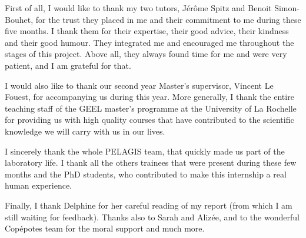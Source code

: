 
First of all, I would like to thank my two tutors, Jérôme Spitz and Benoit Simon-Bouhet, for the trust they placed in me and their commitment to me during these five months. I thank them for their expertise, their good advice, their kindness and their good humour. They integrated me and encouraged me throughout the stages of this project. Above all, they always found time for me and were very patient, and I am grateful for that. 

I would also like to thank our second year Master's supervisor, Vincent Le Fouest, for accompanying us during this year. More generally, I thank the entire teaching staff of the GEEL master's programme at the University of La Rochelle for providing us with high quality courses that have contributed to the scientific knowledge we will carry with us in our lives. 

I sincerely thank the whole PELAGIS team, that quickly made us part of the laboratory life. I thank all the others trainees that were present during these few months and the PhD students, who contributed to make this internship a real human experience. 

Finally, I thank Delphine for her careful reading of my report (from which I am still waiting for feedback). Thanks also to Sarah and Alizée, and to the wonderful Copépotes team for the moral support and much more.